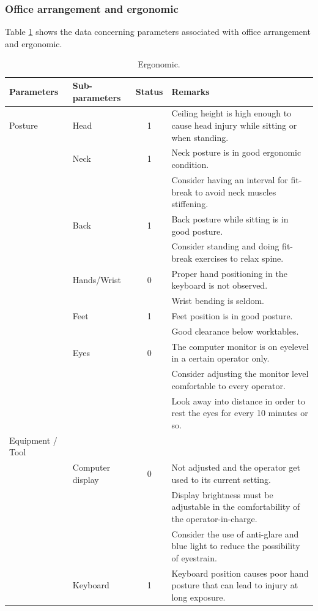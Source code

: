 \subsubsection{Office arrangement and ergonomic}
Table \ref{ch05_tbl_egornomic} shows the data concerning parameters associated with office arrangement and ergonomic. 

\begin{table}[!htb]
	\caption{Ergonomic.}
	\label{ch05_tbl_egornomic}
	{\scriptsize
\begin{tabular}{p{2cm}|l|c|p{8cm}}
	\hline
	Parameters & Sub-parameters & Status & Remarks \\ 
	\hline
	Posture & Head & 1 & Ceiling height is high enough to cause head injury while sitting or when standing. \\ 
	&  Neck & 1 & Neck posture is in good ergonomic condition. \\ 
	&  &  & Consider having an interval for fit-break to avoid neck muscles stiffening. \\ 
	& Back & 1 & Back posture while sitting is in good posture.  \\ 
	&  &  & Consider standing and doing fit-break exercises to relax spine.  \\ 
	& Hands/Wrist  & 0 & Proper hand positioning in the keyboard is not observed. \\ 
	&  &  & Wrist bending is seldom. \\ 
	& Feet & 1 & Feet position is in good posture. \\ 
	&  &  & Good clearance below worktables. \\ 
	& Eyes & 0 & The computer monitor is on eyelevel in a certain operator only. \\ 
	&  &  & Consider adjusting the monitor level comfortable to every operator. \\ 
	&  &  & Look away into distance in order to rest the eyes for every 10 minutes or so. \\ 
	\hline
	Equipment / Tool &  &  &  \\ 
	& Computer display & 0 & Not adjusted and the operator get used to its current setting. \\ 
	&  &  & Display brightness must be adjustable in the comfortability of the operator-in-charge. \\ 
	&  &  & Consider the use of anti-glare and blue light to reduce the possibility of eyestrain. \\ 
	& Keyboard & 1 & Keyboard position causes poor hand posture that can lead to injury at long exposure. \\ 

\end{tabular}}
\end{table}
